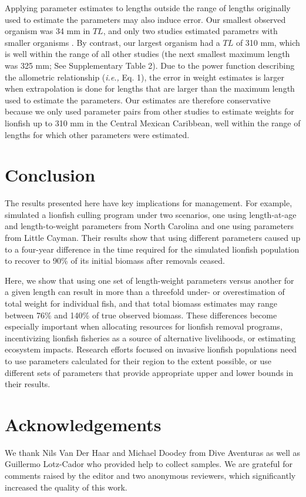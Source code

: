 \documentclass[fleqn,10pt,lineno]{wlpeerj} %
\begin{document}
Applying parameter estimates to lengths outside the range of lengths
originally used to estimate the parameters may also induce error. Our
smallest observed organism was 34 mm in \(TL\), and only two studies
estimated parametrs with smaller organisms
\citep{edwards_2014,sabidoitza_2016}. By contrast, our largest organism
had a \(TL\) of 310 mm, which is well within the range of all other
studies (the next smallest maximum length was 325 mm; See Supplementary
Table 2). Due to the power function describing the allometric
relationship (\emph{i.e.,} Eq. 1), the error in weight estimates is
larger when extrapolation is done for lengths that are larger than the
maximum length used to estimate the parameters. Our estimates are
therefore conservative because we only used parameter pairs from other
studies to estimate weights for lionfish up to 310 mm in the Central
Mexican Caribbean, well within the range of lengths for which other
parameters were estimated.

\section*{Conclusion}

The results presented here have key implications for management. For
example, \citet{edwards_2014} simulated a lionfish culling program under
two scenarios, one using length-at-age and length-to-weight parameters
from North Carolina and one using parameters from Little Cayman. Their
results show that using different parameters caused up to a four-year
difference in the time required for the simulated lionfish population to
recover to 90\% of its initial biomass after removals ceased.

Here, we show that using one set of length-weight parameters versus another for a
given length can result in more than a threefold under- or
overestimation of total weight for individual fish, and that total
biomass estimates may range between 76\% and 140\% of true observed
biomass. These differences become especially important when allocating
resources for lionfish removal programs, incentivizing lionfish
fisheries as a source of alternative livelihoods, or estimating
ecosystem impacts. Research efforts focused on invasive lionfish
populations need to use parameters calculated for their region to the
extent possible, or use different sets of parameters that provide
appropriate upper and lower bounds in their results.

\section*{Acknowledgements}

We thank Nils Van Der Haar and Michael Doodey from Dive Aventuras as
well as Guillermo Lotz-Cador who provided help to collect samples. We
are grateful for comments raised by the editor and two anonymous
reviewers, which significantly increased the quality of this work.



\end{document}
